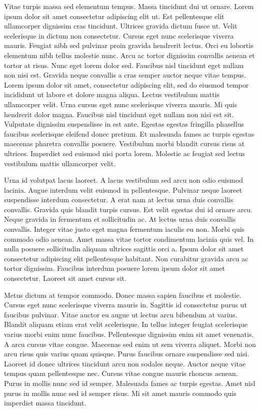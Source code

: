 \documentclass[11pt,a4paper]{article}
\begin{document}
Vitae turpis massa sed elementum tempus. Massa tincidunt dui ut ornare. Lorem ipsum dolor sit amet consectetur adipiscing elit ut. Est pellentesque elit ullamcorper dignissim cras tincidunt. Ultrices gravida dictum fusce ut. Velit scelerisque in dictum non consectetur. Cursus eget nunc scelerisque viverra mauris. Feugiat nibh sed pulvinar proin gravida hendrerit lectus. Orci eu lobortis elementum nibh tellus molestie nunc. Arcu ac tortor dignissim convallis aenean et tortor at risus. Nunc eget lorem dolor sed. Faucibus nisl tincidunt eget nullam non nisi est. Gravida neque convallis a cras semper auctor neque vitae tempus.
Lorem ipsum dolor sit amet, consectetur adipiscing elit, sed do eiusmod tempor incididunt ut labore et dolore magna aliqua. Lectus vestibulum mattis ullamcorper velit. Urna cursus eget nunc scelerisque viverra mauris. Mi quis hendrerit dolor magna. Faucibus nisl tincidunt eget nullam non nisi est sit. Vulputate dignissim suspendisse in est ante. Egestas egestas fringilla phasellus faucibus scelerisque eleifend donec pretium. Et malesuada fames ac turpis egestas maecenas pharetra convallis posuere. Vestibulum morbi blandit cursus risus at ultrices. Imperdiet sed euismod nisi porta lorem. Molestie ac feugiat sed lectus vestibulum mattis ullamcorper velit.

Urna id volutpat lacus laoreet. A lacus vestibulum sed arcu non odio euismod lacinia. Augue interdum velit euismod in pellentesque. Pulvinar neque laoreet suspendisse interdum consectetur. A erat nam at lectus urna duis convallis convallis. Gravida quis blandit turpis cursus. Est velit egestas dui id ornare arcu. Neque gravida in fermentum et sollicitudin ac. At lectus urna duis convallis convallis. Integer vitae justo eget magna fermentum iaculis eu non. Morbi quis commodo odio aenean. Amet massa vitae tortor condimentum lacinia quis vel. In nulla posuere sollicitudin aliquam ultrices sagittis orci a. Ipsum dolor sit amet consectetur adipiscing elit pellentesque habitant. Non curabitur gravida arcu ac tortor dignissim. Faucibus interdum posuere lorem ipsum dolor sit amet consectetur. Laoreet sit amet cursus sit.

Metus dictum at tempor commodo. Donec massa sapien faucibus et molestie. Cursus eget nunc scelerisque viverra mauris in. Sagittis id consectetur purus ut faucibus pulvinar. Vitae auctor eu augue ut lectus arcu bibendum at varius. Blandit aliquam etiam erat velit scelerisque. In tellus integer feugiat scelerisque varius morbi enim nunc faucibus. Pellentesque dignissim enim sit amet venenatis. A arcu cursus vitae congue. Maecenas sed enim ut sem viverra aliquet. Morbi non arcu risus quis varius quam quisque. Purus faucibus ornare suspendisse sed nisi. Laoreet id donec ultrices tincidunt arcu non sodales neque. Auctor neque vitae tempus quam pellentesque nec. Cursus vitae congue mauris rhoncus aenean. Purus in mollis nunc sed id semper. Malesuada fames ac turpis egestas. Amet nisl purus in mollis nunc sed id semper risus. Mi sit amet mauris commodo quis imperdiet massa tincidunt.
\end{document}
